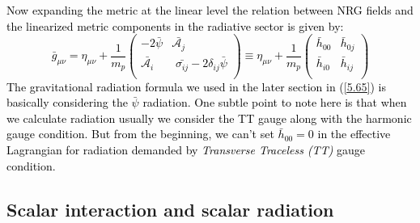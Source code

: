 \par  \textcolor{black}{Now expanding the metric at the linear level the  relation between NRG fields and the linearized metric components in the radiative sector is given by:$$
\bar g_{\mu\nu}=\eta_{\mu\nu}+\frac{1}{m_p}
\begin{pmatrix}
-2\bar\psi & \bar{\mathcal{A}_j}\\
\bar{\mathcal{A}_i} & \,\,\bar{\sigma_{ij}}-2\delta_{ij}\bar\psi\\
\end{pmatrix}\equiv\eta_{\mu\nu}+\frac{1}{m_p}
\begin{pmatrix}
\bar h_{00} & \bar h_{0j}\\
\bar h_{i0} & \bar h_{ij}\\
\end{pmatrix}
$$
The gravitational radiation formula we used in the later section in (\ref{5.65}) is basically considering the $\bar\psi$ radiation. One subtle point to note here is that when we calculate radiation usually we consider the TT gauge along with the harmonic gauge condition. But from the beginning, we can't set $\bar h_{00}=0$ in the effective Lagrangian for radiation demanded by \textit{Transverse Traceless (TT)} gauge condition.}

\subsection{Scalar interaction and scalar radiation}\label{subsec:radiated_scalars}

